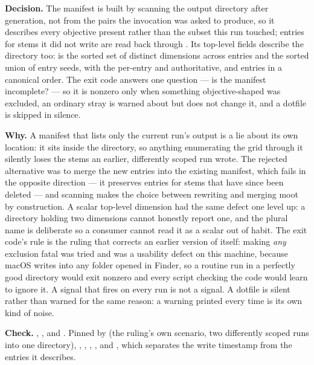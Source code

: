 \label{app:so:a4:r35}

\textbf{Decision.} The manifest is built by scanning the output directory after
generation, not from the pairs the invocation was asked to produce, so it
describes every objective present rather than the subset this run touched;
entries for stems it did not write are read back through
. Its top-level fields describe the directory
too:  is the sorted set of distinct dimensions across entries and
 the sorted union of entry seeds, with the per-entry 
and  authoritative, and entries in a canonical order. The exit
code answers one question --- is the manifest incomplete? --- so it is nonzero
only when something objective-shaped was excluded, an ordinary stray is warned
about but does not change it, and a dotfile is skipped in silence.

\textbf{Why.} A manifest that lists only the current run's output is a lie
about its own location: it sits inside the directory, so anything enumerating
the grid through it silently loses the stems an earlier, differently scoped run
wrote. The rejected alternative was to merge the new entries into the existing
manifest, which fails in the opposite direction --- it preserves entries for
stems that have since been deleted --- and scanning makes the choice between
rewriting and merging moot by construction. A scalar top-level dimension had
the same defect one level up: a directory holding two dimensions cannot
honestly report one, and the plural name is deliberate so a consumer cannot
read it as a scalar out of habit. The exit code's rule is the ruling that
corrects an earlier version of itself: making \emph{any} exclusion fatal was
tried and was a usability defect on this machine, because macOS writes
 into any folder opened in Finder, so a routine run in a
perfectly good directory would exit nonzero and every script checking the code
would learn to ignore it. A signal that fires on every run is not a signal. A
dotfile is silent rather than warned for the same reason: a warning printed
every time is its own kind of noise.

\begin{sloppypar}
\textbf{Check.} ,
,  and
. Pinned by
(the ruling's own scenario, two differently scoped runs into one directory),
,
,
,
,
and
,
which separates the write timestamp from the entries it describes.
\end{sloppypar}

